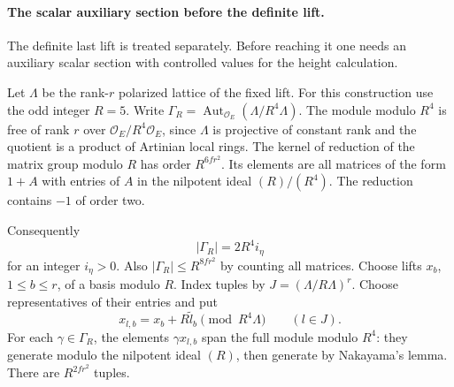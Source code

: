 \paragraph{The scalar auxiliary section before the definite lift.}
\label{par:selected-auxiliary-cusp}

The definite last lift is treated separately. Before reaching it one needs an auxiliary scalar section with controlled values for the height calculation.

Let \(\Lambda\) be the rank-\(r\) polarized lattice of the fixed lift. For this construction use the odd integer \(R=5\). Write
\(\Gamma_R=\operatorname{Aut}_{\mathcal O_E}(\Lambda/R^4\Lambda)\).
The module modulo \(R^4\) is free of rank \(r\) over
\(\mathcal O_E/R^4\mathcal O_E\), since \(\Lambda\) is projective of
constant rank and the quotient is a product of Artinian local
rings. The kernel of reduction of the matrix group modulo \(R\)
has order \(R^{6fr^2}\). Its elements are all matrices of the
form \(1+A\) with entries of \(A\) in the nilpotent ideal
\((R)/(R^4)\). The reduction contains \(-1\) of order two.

Consequently 
\[
  |\Gamma_R|=2R^4 i_\eta
\]
 for an integer
\(i_\eta>0\). Also \(|\Gamma_R|\le R^{8fr^2}\) by counting all
matrices. Choose lifts \(x_b\), \(1\le b\le r\), of a basis
modulo \(R\). Index tuples by
\(J=(\Lambda/R\Lambda)^r\). Choose representatives of their
entries and put
\[
             x_{l,b}=x_b+R\widetilde l_b\pmod {R^4\Lambda}
             \qquad(l\in J).
\]
For each \(\gamma\in\Gamma_R\), the elements \(\gamma x_{l,b}\)
span the full module modulo \(R^4\): they generate modulo the
nilpotent ideal \((R)\), then generate by Nakayama's lemma.
There are \(R^{2fr^2}\) tuples.
\label{cor:selected-auxiliary-cusp-1}

